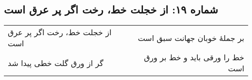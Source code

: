 \begin{center}
\section*{شماره ۱۹: از خجلت خط، رخت اگر پر عرق است}
\label{sec:019}
\begin{longtable}{l p{0.5cm} r}
از خجلت خط، رخت اگر پر عرق است
&&
بر جملهٔ خوبان جهانت سبق است
\\
گر از ورق گلت خطی پیدا شد
&&
خط را ورقی باید و خط بر ورق است
\\
\end{longtable}
\end{center}
